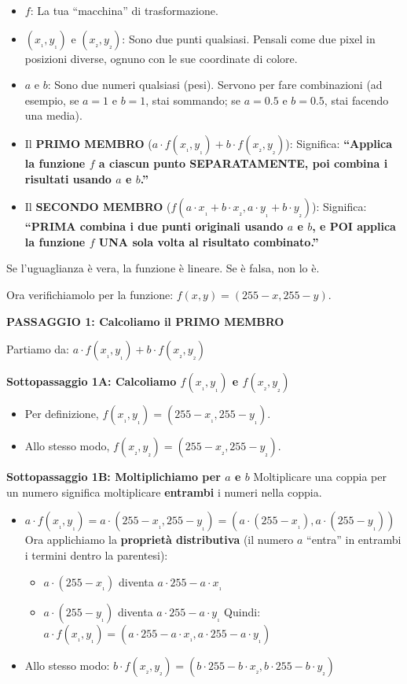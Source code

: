 \documentclass[
]{article}
\providecommand{\tightlist}{%
  \setlength{\itemsep}{0pt}\setlength{\parskip}{0pt}}
\begin{document}
\begin{itemize}
\tightlist
\item
  \(f\): La tua ``macchina'' di trasformazione.
\item
  \((x_₁, y_₁)\) e \((x_₂, y_₂)\): Sono due punti qualsiasi. Pensali come due pixel in posizioni diverse, ognuno con le sue coordinate di colore.
\item
  \(a\) e \(b\): Sono due numeri qualsiasi (pesi). Servono per fare combinazioni (ad esempio, se \(a=1\) e \(b=1\), stai sommando; se \(a=0.5\) e \(b=0.5\), stai facendo una media).
\item
  Il \textbf{PRIMO MEMBRO} (\(a\cdot f(x_₁,y_₁) + b \cdot f(x_₂,y_₂)\)): Significa: \textbf{``Applica la funzione \(f\) a ciascun punto SEPARATAMENTE, poi combina i risultati usando \(a\) e \(b\).''}
\item
  Il \textbf{SECONDO MEMBRO} (\(f(a \cdot x_₁+b \cdot x_₂, a \cdot y_₁+b \cdot y_₂)\)): Significa: \textbf{``PRIMA combina i due punti originali usando \(a\) e \(b\), e POI applica la funzione \(f\) UNA sola volta al risultato combinato.''}
\end{itemize}

Se l'uguaglianza è vera, la funzione è lineare. Se è falsa, non lo è.

Ora verifichiamolo per la funzione: \(f(x, y) = (255 - x, 255 - y)\).

\textbf{PASSAGGIO 1: Calcoliamo il PRIMO MEMBRO}

Partiamo da: \(a \cdot f(x_₁, y_₁) + b \cdot f(x_₂, y_₂)\)

\textbf{Sottopassaggio 1A: Calcoliamo \(f(x_₁, y_₁)\) e \(f(x_₂, y_₂)\)}

\begin{itemize}
\tightlist
\item
  Per definizione, \(f(x_₁, y_₁) = (255 - x_₁, 255 - y_₁)\).
\item
  Allo stesso modo, \(f(x_₂, y_₂) = (255 - x_₂, 255 - y_₂)\).
\end{itemize}

\textbf{Sottopassaggio 1B: Moltiplichiamo per \(a\) e \(b\)}
Moltiplicare una coppia per un numero significa moltiplicare \textbf{entrambi} i numeri nella coppia.

\begin{itemize}
\tightlist
\item
  \(a \cdot f(x_₁, y_₁) = a \cdot (255 - x_₁, 255 - y_₁) = (a\cdot(255 - x_₁), a\cdot(255 - y_₁))\)
  Ora applichiamo la \textbf{proprietà distributiva} (il numero \(a\) ``entra'' in entrambi i termini dentro la parentesi):

  \begin{itemize}
  \tightlist
  \item
    \(a \cdot (255 - x_₁)\) diventa \(a \cdot 255 - a \cdot x_₁\)
  \item
    \(a \cdot (255 - y_₁)\) diventa \(a \cdot 255 - a \cdot y_₁\)
    Quindi: \(a \cdot f(x_₁, y_₁) = (a\cdot 255 - a\cdot x_₁, a \cdot 255 - a\cdot y_₁)\)
  \end{itemize}
\item
  Allo stesso modo: \(b \cdot f(x_₂, y_₂) = (b\cdot255 - b\cdot x_₂, b\cdot255 - b\cdot y_₂)\)
\end{itemize}
\end{document}
